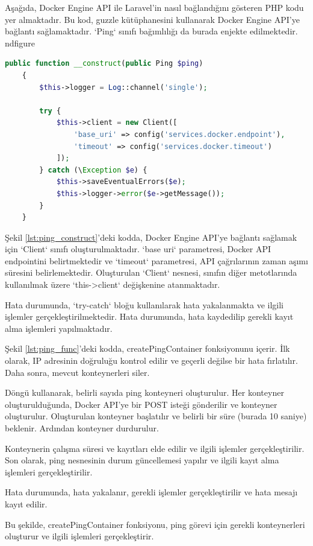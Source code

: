 Aşağıda, Docker Engine API ile Laravel'in nasıl bağlandığını gösteren PHP kodu yer almaktadır. Bu kod, guzzle\cite{guzzle_documentation} kütüphanesini kullanarak Docker Engine API'ye bağlantı sağlamaktadır. `Ping` sınıfı bağımlılığı da burada enjekte edilmektedir.
nd{figure}

\begin{lstlisting}[language=PHP, caption={Ping sınıfının yapıcısı}, label={lst:ping_construct}]
	public function __construct(public Ping $ping)
	{
		$this->logger = Log::channel('single');
		
		try {
			$this->client = new Client([
				'base_uri' => config('services.docker.endpoint'),
				'timeout' => config('services.docker.timeout')
			]);
		} catch (\Exception $e) {
			$this->saveEventualErrors($e);
			$this->logger->error($e->getMessage());
		}
	}
	\end{lstlisting}
	


Şekil \ref{lst:ping_construct}'deki kodda, Docker Engine API'ye bağlantı sağlamak için `Client` sınıfı oluşturulmaktadır. `base uri` parametresi, Docker API endpointini belirtmektedir ve `timeout` parametresi, API çağrılarının zaman aşımı süresini belirlemektedir. Oluşturulan `Client` nesnesi, sınıfın diğer metotlarında kullanılmak üzere `this->client` değişkenine atanmaktadır.

Hata durumunda, `try-catch` bloğu kullanılarak hata yakalanmakta ve ilgili işlemler gerçekleştirilmektedir. Hata durumunda, hata kaydedilip gerekli kayıt alma işlemleri yapılmaktadır.

Şekil \ref{lst:ping_func}'deki kodda, createPingContainer fonksiyonunu içerir. İlk olarak, IP adresinin doğruluğu kontrol edilir ve geçerli değilse bir hata fırlatılır. Daha sonra, mevcut konteynerleri siler.

Döngü kullanarak, belirli sayıda ping konteyneri oluşturulur. Her konteyner oluşturulduğunda, Docker API'ye bir POST isteği gönderilir ve konteyner oluşturulur. Oluşturulan konteyner başlatılır ve belirli bir süre (burada 10 saniye) beklenir. Ardından konteyner durdurulur.

Konteynerin çalışma süresi ve kayıtları elde edilir ve ilgili işlemler gerçekleştirilir. Son olarak, ping nesnesinin durum güncellemesi yapılır ve ilgili kayıt alma işlemleri gerçekleştirilir.

Hata durumunda, hata yakalanır, gerekli işlemler gerçekleştirilir ve hata mesajı kayıt edilir.

Bu şekilde, createPingContainer fonksiyonu, ping görevi için gerekli konteynerleri oluşturur ve ilgili işlemleri gerçekleştirir.

